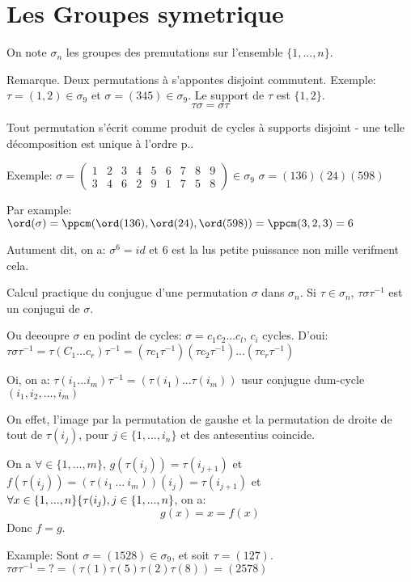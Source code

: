 \section{Les Groupes symetrique} %

On note $\sigma_n$ les groupes des premutations sur l'ensemble $\{1, ..., n\}$.

Remarque. Deux permutations à s'appontes disjoint commutent.
Exemple: $\tau=(1, 2)\in \sigma_9$ et $\sigma=(345) \in \sigma_9$.
Le support de $\tau$ est $\{1,2\}$. 
$$\tau\sigma =\sigma \tau$$

\begin{theorem}
	Tout permutation s'écrit comme produit de cycles à supports disjoint - une telle décomposition est unique à l'ordre p..
\end{theorem}

Exemple: $\sigma = \left(\begin{array}{ccccccccc}1&2&3&4&5&6&7&8&9\\3&4&6&2&9&1&7&5&8\end{array}\right)\in\sigma_9$
$\sigma=(136)(24)(598)$

Par example: $\ord(\sigma)=\ppcm(\ord(136), \ord(24), \ord(598))=\ppcm(3,2,3)=6$

Autument dit, on a: $\sigma^6=id$ et 6 est la lus petite puissance non mille verifment cela.

Calcul practique du conjugue d'une permutation $\sigma$ dans $\sigma_n$. Si $\tau\in\sigma_n$, $\tau\sigma\tau^{-1}$ est un conjugui de $\sigma$.

Ou deeoupre $\sigma$ en podint de cycles: $\sigma=c_1 c_2...c_l$, $c_i$ cycles.
D'oui: $\tau\sigma\tau^{-1} =\tau(C_1...c_r)\tau^{-1}=(\tau c_1\tau^{-1})(\tau c_2\tau^{-1})...(\tau c_r\tau^{-1})$

Oi, on a: $\tau(i_1...i_m)\tau^{-1}=(\tau(i_1)...\tau(i_m))$ usur conjugue dum-cycle $(i_1, i_2, ..., i_m)$

On effet, l'image par la permutation de gaushe et la permutation de droite de tout de $\tau(i_j)$, pour $j\in\{1,...,i_n\}$ et des antesentius coincide.

On a $\forall\in\{1,...,m\}$, $g(\tau(i_j))=\tau(i_{j+1})$ et $f(\tau(i_j))=(\tau(i_1\ ...\ i_m))(i_j)=\tau(i_{j+1})$
et $\forall x\in \{ 1,...,n\}\\ \{\tau(i_j), j\in\{1,...,n\}$, on a:
$$g(x)=x=f(x)$$
Donc $f=g$.

Example:
Sont $\sigma=(1528)\in\sigma_9$, et soit $\tau=(127)$.
$\tau\sigma\tau^{-1}=?= (\tau(1)\tau(5)\tau(2)\tau(8))=(2578)$

